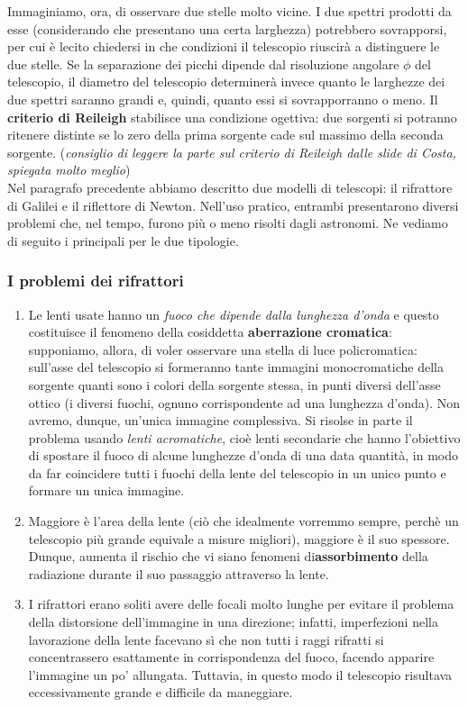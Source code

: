 \documentclass[a4paper,11pt]{article}
\begin{document}
Immaginiamo, ora, di osservare due stelle molto vicine. I due spettri prodotti da esse (considerando che presentano una certa larghezza) potrebbero sovrapporsi, per cui è lecito chiedersi in che condizioni il telescopio riuscirà a distinguere le due stelle. Se la separazione dei picchi dipende dal risoluzione angolare \(\phi\) del telescopio, il diametro del telescopio determinerà invece quanto le larghezze dei due spettri saranno grandi e, quindi, quanto essi si sovrapporranno o meno.  Il \textbf{criterio di Reileigh} stabilisce una condizione ogettiva: due sorgenti si potranno ritenere distinte se lo zero della prima sorgente cade sul massimo della seconda sorgente.  (\textit{consiglio di leggere la parte sul criterio di Reileigh dalle slide di Costa, spiegata molto meglio})\\
Nel paragrafo precedente abbiamo descritto due modelli di telescopi: il rifrattore di Galilei e il riflettore di Newton. Nell'uso pratico, entrambi presentarono diversi problemi che, nel tempo, furono più o meno risolti dagli astronomi. Ne vediamo di seguito i principali per le due tipologie. 

\subsubsection{I problemi dei rifrattori}
 \begin{enumerate}
\item Le lenti usate hanno un \textit{fuoco che dipende dalla lunghezza d'onda} e questo costituisce il fenomeno della cosiddetta \textbf{aberrazione cromatica}: supponiamo, allora, di voler osservare una stella di luce policromatica: sull'asse del telescopio si formeranno tante immagini monocromatiche della sorgente quanti sono i colori della sorgente stessa, in punti diversi dell'asse ottico (i diversi fuochi, ognuno corrispondente ad una lunghezza d'onda). Non avremo, dunque, un'unica immagine complessiva.
Si risolse in parte il problema usando \textit{lenti acromatiche}, cioè lenti secondarie che hanno l'obiettivo di spostare il fuoco di alcune lunghezze d'onda di una data quantità, in modo da far coincidere tutti i fuochi della lente del telescopio in un unico punto e formare un unica immagine.


\item Maggiore è l'area della lente (ciò che idealmente vorremmo sempre, perchè un telescopio più grande equivale a misure migliori), maggiore è il suo spessore. Dunque, aumenta il rischio che vi siano fenomeni di\textbf{assorbimento}  della radiazione durante il suo passaggio attraverso la lente. 


\item I rifrattori erano soliti avere delle focali molto lunghe per evitare il problema della distorsione dell'immagine in una direzione; infatti, imperfezioni nella lavorazione della lente facevano sì che non tutti i raggi rifratti si concentrassero esattamente in corrispondenza del fuoco, facendo apparire l'immagine un po' allungata. Tuttavia, in questo modo il telescopio risultava eccessivamente grande e difficile da maneggiare.
 \end{enumerate}
\end{document}
